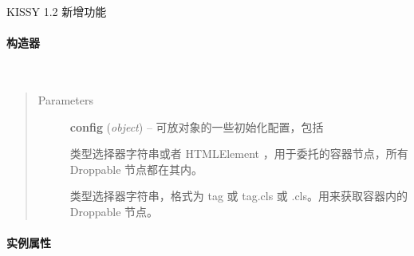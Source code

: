 \documentclass[letterpaper,10pt,english]{sphinxmanual}
\begin{document}


KISSY 1.2 {\hyperref[api/seed/loader/index:module-Loader]{}} 新增功能




\paragraph{构造器}
\label{api/component/dd/droppable-delegate:id2}

\begin{fulllineitems}
\label{api/component/dd/droppable-delegate:DD.DroppableDelegate}~\begin{quote}\begin{description}
\item[{Parameters}] \leavevmode
\textbf{config} (\emph{object}) --
可放对象的一些初始化配置，包括


\begin{fulllineitems}
\label{api/component/dd/droppable-delegate:DD.DroppableDelegate.config.container}
类型选择器字符串或者 HTMLElement ，用于委托的容器节点，所有 Droppable 节点都在其内。

\end{fulllineitems}



\begin{fulllineitems}
\label{api/component/dd/droppable-delegate:DD.DroppableDelegate.config.selector}
类型选择器字符串，格式为 tag 或 tag.cls 或 .cls。用来获取容器内的 Droppable 节点。

\end{fulllineitems}



\end{description}\end{quote}

\end{fulllineitems}



\paragraph{实例属性}
\label{api/component/dd/droppable-delegate:id3}
\end{document}

